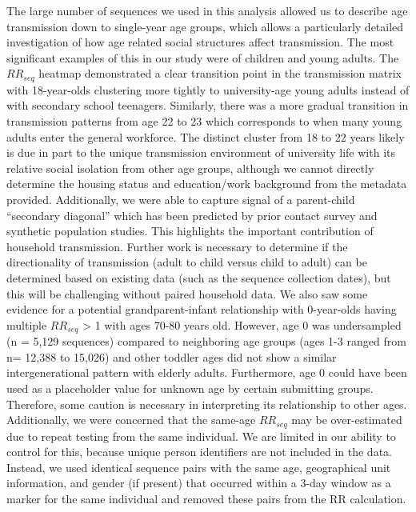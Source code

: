 \documentclass[11pt, letterpaper, oneside]{article}
\begin{document}
The large number of sequences we used in this analysis allowed us to describe age transmission down to single-year age groups, which allows a particularly detailed investigation of how age related social structures affect transmission.
The most significant examples of this in our study were of children and young adults.
The $RR_{seq}$ heatmap demonstrated a clear transition point in the transmission matrix with 18-year-olds clustering more tightly to university-age young adults instead of with secondary school teenagers.
Similarly, there was a more gradual transition in transmission patterns from age 22 to 23 which corresponds to when many young adults enter the general workforce.
The distinct cluster from 18 to 22 years likely is due in part to the unique transmission environment of university life with its relative social isolation from other age groups, although we cannot directly determine the housing status and education/work background from the metadata provided.
Additionally, we were able to capture signal of a parent-child ``secondary diagonal'' which has been predicted by prior contact survey and synthetic population studies.\autocite{mossongSocialContactsMixing2008,premProjectingContactMatrices2021,mistryInferringHighresolutionHuman2021}
This highlights the important contribution of household transmission.
Further work is necessary to determine if the directionality of transmission (adult to child versus child to adult) can be determined based on existing data (such as the sequence collection dates), but this will be challenging without paired household data.
We also saw some evidence for a potential grandparent-infant relationship with 0-year-olds having multiple $RR_{seq}$ > 1 with ages 70-80 years old.
However, age 0 was undersampled (n = 5,129 sequences) compared to neighboring age groups (ages 1-3 ranged from n= 12,388 to 15,026) and other toddler ages did not show a similar intergenerational pattern with elderly adults.
Furthermore, age 0 could have been used as a placeholder value for unknown age by certain submitting groups.
Therefore, some caution is necessary in interpreting its relationship to other ages.
Additionally, we were concerned that the same-age $RR_{seq}$ may be over-estimated due to repeat testing from the same individual.
We are limited in our ability to control for this, because unique person identifiers are not included in the data.
Instead, we used identical sequence pairs with the same age, geographical unit information, and gender (if present) that occurred within a 3-day window as a marker for the same individual and removed these pairs from the RR calculation.
\end{document}
